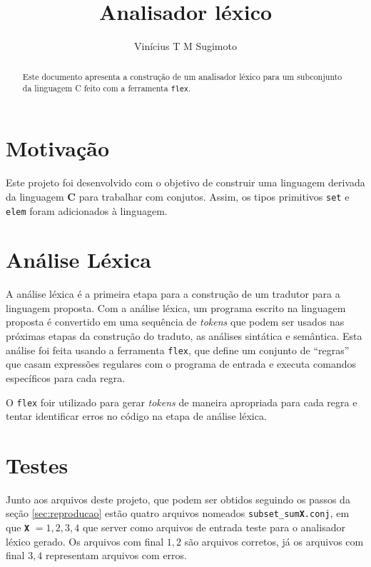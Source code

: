 \documentclass{llncs}
\title{Analisador léxico}
\author{Vinícius T M Sugimoto}
\institute{CiC-UnB}
\begin{document}
\maketitle
\begin{abstract}
	\hfuzz=3pt
	Este documento apresenta a construção de um analisador léxico para um subconjunto da linguagem C feito com a ferramenta \texttt{flex}.
\end{abstract}

\section{Motivação}
\label{sec:motivacao}

Este projeto foi desenvolvido com o objetivo de construir uma linguagem derivada da linguagem \textbf{C} para trabalhar com conjutos. Assim, os tipos primitivos \texttt{set} e \texttt{elem} foram adicionados à linguagem.

\section{Análise Léxica}
\label{sec:analise_lexica}
A análise léxica é a primeira etapa para a construção de um tradutor para a linguagem proposta. Com a análise léxica, um programa escrito na linguagem proposta é convertido em uma sequência de \textit{tokens} que podem ser usados nas próximas etapas da construção do traduto, as análises sintática e semântica. Esta análise foi feita usando a ferramenta \texttt{flex}, que define um conjunto de ``regras'' que casam expressões regulares com o programa de entrada e executa comandos específicos para cada regra.

O \texttt{flex} foir utilizado para gerar \textit{tokens} de maneira apropriada para cada regra e tentar identificar erros no código na etapa de análise léxica.

\section{Testes}
\label{sec:testes}

Junto aos arquivos deste projeto, que podem ser obtidos seguindo os passos da seção \ref{sec:reproducao} estão quatro arquivos nomeados \texttt{subset\_sum\textbf{X}.conj}, em que {\bf\tt X} $= 1,2,3,4$ que server como arquivos de entrada teste para o analisador léxico gerado. Os arquivos com final $1,2$ são arquivos corretos, já os arquivos com final $3,4$ representam arquivos com erros.
\end{document}
